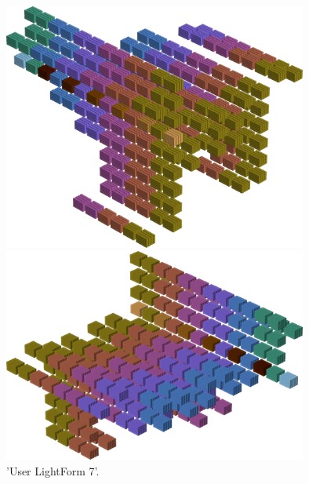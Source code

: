 \begin{figure}[H]
    \centering
    \begin{adjustbox}{width=10cm,center}
      \includegraphics[width=10cm]{src/colorspace_patterns/pattern15-45.png}%
    \end{adjustbox}
    \begin{adjustbox}{width=10cm}
      \includegraphics[width=10cm]{src/colorspace_patterns/pattern15-225.png}%
    \end{adjustbox}
\caption{'User LightForm 7'.}
\end{figure}
\clearpage

